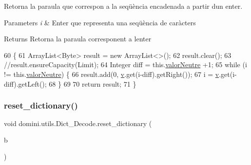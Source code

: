 Retorna la paraula que correspon a la seqüència encadenada a partir d\textquotesingle{}un enter. 


\begin{DoxyParams}{Parameters}
{\em i} & Enter que representa una seqüència de caràcters \\
\hline
\end{DoxyParams}
\begin{DoxyReturn}{Returns}
Retorna la paraula corresponent a l\textquotesingle{}enter 
\end{DoxyReturn}

\begin{DoxyCode}
60                                               \{
61         ArrayList<Byte> result = \textcolor{keyword}{new} ArrayList<>();
62         result.clear();
63         \textcolor{comment}{//result.ensureCapacity(Limit);}
64         Integer diff = this.\hyperlink{classdomini_1_1utils_1_1Dict__Decode_a6ef2d17f449cf7a658a4bf983e2fb474}{valorNeutre} +1;
65         \textcolor{keywordflow}{while} (i != this.\hyperlink{classdomini_1_1utils_1_1Dict__Decode_a6ef2d17f449cf7a658a4bf983e2fb474}{valorNeutre}) \{
66             result.add(0, \hyperlink{classdomini_1_1utils_1_1Dict__Decode_a351bb8836b391e5e21ebc9cc1943a22d}{v}.get(i-diff).getRight());
67             i = \hyperlink{classdomini_1_1utils_1_1Dict__Decode_a351bb8836b391e5e21ebc9cc1943a22d}{v}.get(i-diff).getLeft();
68         \}
69 
70         \textcolor{keywordflow}{return} result;
71     \}
\end{DoxyCode}
\mbox{\label{classdomini_1_1utils_1_1Dict__Decode_a635432505df1ceaa58a987bb80c6b0a3}} 
\subsubsection{\texorpdfstring{reset\+\_\+dictionary()}{reset\_dictionary()}}
{\footnotesize\ttfamily void domini.\+utils.\+Dict\+\_\+\+Decode.\+reset\+\_\+dictionary (\begin{DoxyParamCaption}\item[{Boolean}]{b }\end{DoxyParamCaption})\hspace{0.3cm}{\ttfamily [inline]}}



